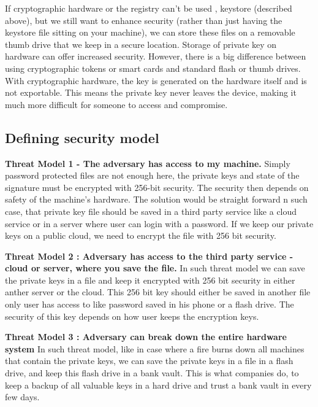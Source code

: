 If cryptographic hardware or the registry can’t be used , keystore (described above), but we still want to enhance security (rather than just having the keystore file sitting on your machine), we can store these files on a removable thumb drive that we keep in a secure location. Storage of private key on hardware can offer increased security. However, there is a big difference between using cryptographic tokens or smart cards and standard flash or thumb drives. With cryptographic hardware, the key is generated on the hardware itself and is not exportable. This means the private key never leaves the device, making it much more difficult for someone to access and compromise.

\subsection{Defining security model}
\textbf{Threat Model 1 - The adversary has access to my machine.} Simply password protected files are not enough here, the private keys and state of the signature must be encrypted with 256-bit security. The security then depends on safety of the machine's hardware. The solution would be straight forward n such case, that private key file should be saved in a third party service like a cloud service or in a server where user can login with  a password. If we keep our private keys on a public cloud, we need to encrypt the file with 256 bit security.

\textbf{Threat Model 2 : Adversary has access to the third party service -cloud or server, where you save the file.} In such threat model we can save the private keys in a file and keep it encrypted with 256 bit security in either anther server or the cloud. This 256 bit key should either be saved in another file only user has access to like password saved in his phone or a flash drive. The security of this key depends on how user keeps the encryption keys.

\textbf{Threat Model 3 : Adversary can break down the entire hardware system} In such threat model, like in case where a fire burns down all machines that contain the private keys, we can save the private keys in a file in a flash drive, and keep this flash drive in a bank vault. This is what companies do, to keep a backup of all valuable keys in a hard drive and trust a bank vault in every few days. 






    
    

